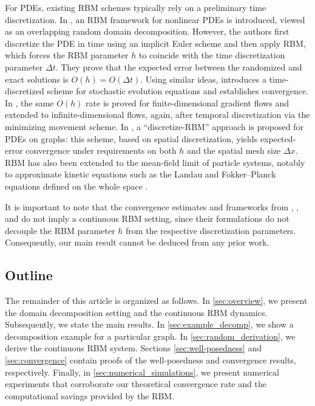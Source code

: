 \documentclass[10pt,a4paper]{amsart}
\begin{document}
For PDEs, existing RBM schemes typically rely on a preliminary time discretization. In \cite{eisenmann2022randomized}, an RBM framework for nonlinear PDEs is introduced, viewed as an overlapping random domain decomposition. However, the authors first discretize the PDE in time using an implicit Euler scheme and then apply RBM, which forces the RBM parameter $h$ to coincide with the time discretization parameter $\Delta t$. They prove that the expected error between the randomized and exact solutions is $O(h)=O(\Delta t)$. Using similar ideas, \cite{MR4828491} introduces a time-discretized scheme for stochastic evolution equations and establishes convergence. In \cite{Corella_hernandez2025}, the same $O(h)$ rate is proved for finite-dimensional gradient flows and extended to infinite-dimensional flows, again, after temporal discretization via the minimizing movement scheme. In \cite{firstpaper}, a “discretize-RBM” approach is proposed for PDEs on graphs: this scheme, based on spatial discretization, yields expected‐error convergence under requirements on both $h$ and the spatial mesh size $\Delta x$. RBM has also been extended to the mean‐field limit of particle systems, notably to approximate kinetic equations such as the Landau and Fokker–Planck equations defined on the whole space \cite{MR4361973,MR4436794,MR4744252}.

It is important to note that the convergence estimates and frameworks from \cite{eisenmann2022randomized}, \cite{Corella_hernandez2025}, and \cite{firstpaper} do not imply a continuous RBM setting, since their formulations do not decouple the RBM parameter $h$ from the respective discretization parameters. Consequently, our main result cannot be deduced from any prior work.



\subsection{Outline}

The remainder of this article is organized as follows.  In \cref{sec:overview}, we present the domain decomposition setting and the continuous RBM dynamics. Subsequently, we state the main results.  In \cref{sec:example_decomp}, we show a decomposition example for a particular graph. In \cref{sec:random_derivation}, we derive the continuous RBM system. Sections \ref{sec:well-posedness} and \ref{sec:convergence} contain proofs of the well‐posedness and convergence results, respectively. Finally, in \cref{sec:numerical_simulations}, we present numerical experiments that corroborate our theoretical convergence rate and the computational savings provided by the RBM.
 
\end{document}
